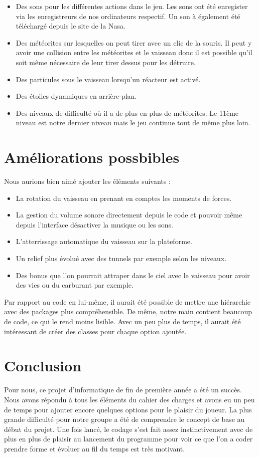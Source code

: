 \begin{itemize}
 \item	Des sons pour les différentes actions dans le jeu. Les sons ont été enregister via les enregistreurs de nos ordinateurs respectif. Un son à également été téléchargé depuis le site de la Nasa\cite{SonNasa}.
 \item	Des météorites sur lesquelles on peut tirer avec un clic de la souris. Il peut y avoir une collision entre les météorites et le vaisseau donc il est possible qu’il soit même nécessaire de leur tirer dessus pour les détruire.
 \item	Des particules sous le vaisseau lorsqu’un réacteur est activé.
 \item	Des étoiles dynamiques en arrière-plan.
 \item	Des niveaux de difficulté où il a de plus en plus de météorites. Le 11ème niveau est notre dernier niveau mais le jeu continue tout de même plus loin.
\end{itemize}

\section{Améliorations possbibles}
Nous aurions bien aimé ajouter les éléments suivants :
\begin{itemize}
 \item La rotation du vaisseau en prenant en comptes les moments de forces.
 \item La gestion du volume sonore directement depuis le code et pouvoir même depuis l’interface désactiver la musique ou les sons.
 \item L’atterrissage automatique du vaisseau sur la plateforme.
 \item Un relief plus évolué avec des tunnels par exemple selon les niveaux.
 \item Des bonus que l’on pourrait attraper dans le ciel avec le vaisseau pour avoir des vies ou du carburant par exemple.
\end{itemize}

Par rapport au code en lui-même, il aurait été possible de mettre une hiérarchie avec des packages plus compréhensible.
De même, notre main contient beaucoup de code, ce qui le rend moins lisible. Avec un peu plus de temps, il aurait été intéressant de créer des classes pour chaque option ajoutée.


\section{Conclusion}
Pour nous, ce projet d’informatique de fin de première année a été un succès. Nous avons répondu à tous les éléments du cahier des charges et avons eu un peu de temps pour ajouter encore quelques options pour le plaisir du joueur. La plus grande difficulté pour notre groupe a été de comprendre le concept de base au début du projet. Une fois lancé, le codage s’est fait assez instinctivement avec de plus en plus de plaisir au lancement du programme pour voir ce que l’on a coder prendre forme et évoluer au fil du temps est très motivant.

